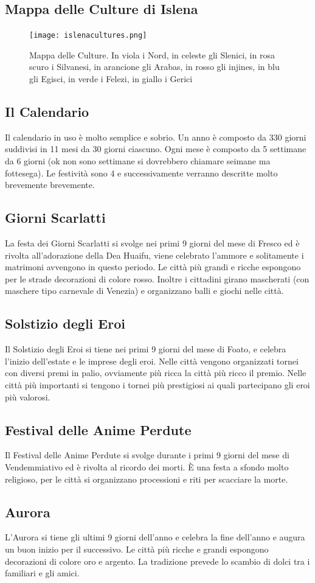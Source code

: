 \documentclass[10pt, a4paper]{report}
\begin{document}
\subsection{Mappa delle Culture di Islena}
\begin{figure}[h!]
	\centering
	\texttt{[image: islenacultures.png]}
	\caption{Mappa delle Culture. In viola i Nord, in celeste gli Slenici, in rosa scuro i Silvanesi, in arancione gli Arabas, in rosso gli injines, in blu gli Egisci, in verde i Felezi, in giallo i Gerici}
\end{figure}
\newpage
\begin{multicols}{2}
\section{Il Calendario}
		Il calendario in uso è molto semplice e sobrio. Un anno è composto da 330 giorni suddivisi in 11 mesi da 30 giorni ciascuno. Ogni mese è composto da 5 settimane da 6 giorni (ok non sono settimane si dovrebbero chiamare seimane ma fottesega). Le festività sono 4 e successivamente verranno descritte molto brevemente brevemente.
	\subsection*{Giorni Scarlatti}
		La festa dei Giorni Scarlatti si svolge nei primi 9 giorni del mese di Fresco ed è rivolta all'adorazione della Dea Huaifu, viene celebrato l'ammore e solitamente i matrimoni avvengono in questo periodo. Le città più grandi e ricche espongono per le strade decorazioni di colore rosso. Inoltre i cittadini girano mascherati (con maschere tipo carnevale di Venezia) e organizzano balli e giochi nelle città.
	\subsection*{Solstizio degli Eroi}
		Il Solstizio degli Eroi si tiene nei primi 9 giorni del mese di Foato, e celebra l'inizio dell'estate e le imprese degli eroi. Nelle città vengono organizzati tornei con diversi premi in palio, ovviamente più ricca la città più ricco il premio. Nelle città più importanti si tengono i tornei più prestigiosi ai quali partecipano gli eroi più valorosi.
	\subsection*{Festival delle Anime Perdute}
		Il Festival delle Anime Perdute si svolge durante i primi 9 giorni del mese di Vendemmiativo ed è rivolta al ricordo dei morti. È una festa a sfondo molto religioso, per le città si organizzano processioni e riti per scacciare la morte.
	\subsection*{Aurora}
		L'Aurora si tiene gli ultimi 9 giorni dell'anno e celebra la fine dell'anno e augura un buon inizio per il successivo. Le città più ricche e grandi espongono decorazioni di colore oro e argento. La tradizione prevede lo scambio di dolci tra i familiari e gli amici.
\end{multicols}
\end{document}
